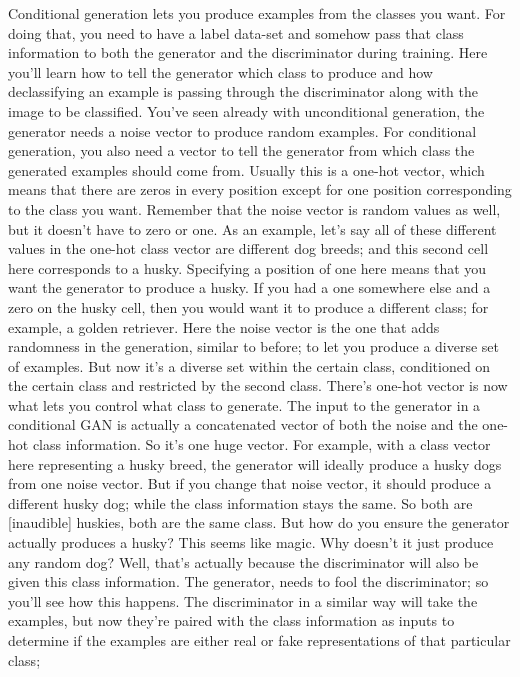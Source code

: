 \documentclass[11pt, onecolumn]{article}
\begin{document}
Conditional generation lets you produce
examples from the classes you want.
For doing that, you need to have
a label data-set and somehow pass
that class information to
both the generator and the discriminator during training.
Here you'll learn how to tell
the generator which class to produce and how
declassifying an example is passing through
the discriminator along with the image to be classified.
You've seen already with unconditional generation,
the generator needs a noise vector
to produce random examples.
For conditional generation,
you also need a vector to tell
the generator from which class
the generated examples should come from.
Usually this is a one-hot vector,
which means that there are zeros in every position
except for one position
corresponding to the class you want.
Remember that the noise vector is random values as well,
but it doesn't have to zero or one.
As an example, let's say all of
these different values in
the one-hot class vector are different dog breeds;
and this second cell here corresponds to a husky.
Specifying a position of one here
means that you want the generator to produce a husky.
If you had a one somewhere else
and a zero on the husky cell,
then you would want it to produce a different class;
for example, a golden retriever.
Here the noise vector is the one that
adds randomness in the generation,
similar to before; to let you
produce a diverse set of examples.
But now it's a diverse set within the certain class,
conditioned on the certain class
and restricted by the second class.
There's one-hot vector is now what
lets you control what class to generate.
The input to the generator
in a conditional GAN is actually
a concatenated vector of
both the noise and the one-hot class information.
So it's one huge vector.
For example, with a class vector
here representing a husky breed,
the generator will ideally produce
a husky dogs from one noise vector.
But if you change that noise vector,
it should produce a different husky dog;
while the class information stays the same.
So both are [inaudible] huskies,
both are the same class.
But how do you ensure
the generator actually produces a husky?
This seems like magic.
Why doesn't it just produce any random dog?
Well, that's actually because
the discriminator will also
be given this class information.
The generator, needs to fool the discriminator;
so you'll see how this happens.
The discriminator in a similar way
will take the examples,
but now they're paired with the class information as
inputs to determine if the examples are
either real or fake representations
of that particular class;
\end{document}
